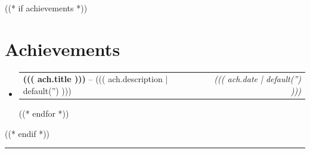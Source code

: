 \documentclass[a4paper,11pt]{article}
\makeatletter
\newcommand{\resumeAchievement}[3]{
\vspace{0.5mm}\item
    \begin{tabular*}{0.97\textwidth}[t]{p{0.78\textwidth}@{\extracolsep{\fill}}r}
        \textbf{#1} -- {\small #2} & \textit{\small #3}
    \end{tabular*}
    \vspace{-2mm}
}
\newcommand{\resumeSubHeadingListStart}{\begin{itemize}[leftmargin=*,labelsep=1.5mm]}
\newcommand{\resumeSubHeadingListEnd}{\end{itemize}\vspace{2mm}}
\makeatother
\begin{document}
((* if achievements *))
\section{Achievements}
\vspace{-0.2mm}
\resumeSubHeadingListStart
  ((* for ach in achievements *))
  \resumeAchievement{((( ach.title )))}
    {((( ach.description | default('') )))}
    {((( ach.date | default('') )))}
  ((* endfor *))
\resumeSubHeadingListEnd
\vspace{-2mm}
((* endif *))

\hspace*{-5mm}\rule{1.035\textwidth}{0.1mm}
\end{document}
